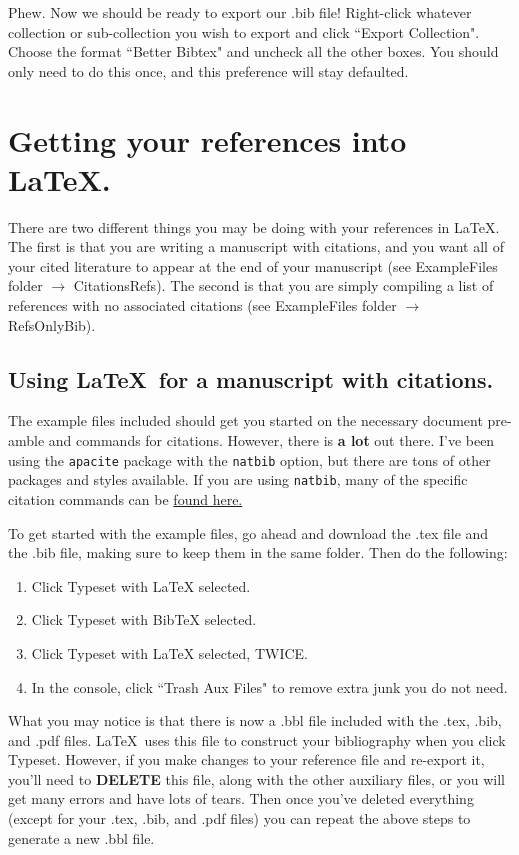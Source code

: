 \documentclass[11pt]{article}
\begin{document}
Phew. Now we should be ready to export our .bib file! Right-click whatever collection or sub-collection you wish to export and click ``Export Collection". Choose the format ``Better Bibtex" and uncheck all the other boxes. You should only need to do this once, and this preference will stay defaulted.\\

\section{Getting your references into \LaTeX.}

There are two different things you may be doing with your references in \LaTeX. The first is that you are writing a manuscript with citations, and you want all of your cited literature to appear at the end of your manuscript (see ExampleFiles folder $\rightarrow$ CitationsRefs). The second is that you are simply compiling a list of references with no associated citations (see ExampleFiles folder $\rightarrow$ RefsOnlyBib).

\subsection{Using \LaTeX\ for a manuscript with citations.}
The example files included should get you started on the necessary document pre-amble and commands for citations. However, there is \textbf{a lot} out there. I've been using the \verb|apacite| package with the \verb|natbib| option, but there are tons of other packages and styles available. If you are using \verb|natbib|, many of the specific citation commands can be \href{https://gking.harvard.edu/files/natbib2.pdf}{found here.}

To get started with the example files, go ahead and download the .tex file and the .bib file, making sure to keep them in the same folder. Then do the following:

\begin{enumerate}
\item{Click Typeset with LaTeX selected.}
\item{Click Typeset with BibTeX selected.}
\item{Click Typeset with LaTeX selected, TWICE.}
\item{In the console, click ``Trash Aux Files" to remove extra junk you do not need.}
\end{enumerate}

What you may notice is that there is now a .bbl file included with the .tex, .bib, and .pdf files. \LaTeX\ uses this file to construct your bibliography when you click Typeset. However, if you make changes to your reference file and re-export it, you'll need to \textbf{DELETE} this file, along with the other auxiliary files, or you will get many errors and have lots of tears. Then once you've deleted everything (except for your .tex, .bib, and .pdf files) you can repeat the above steps to generate a new .bbl file.
\end{document}
